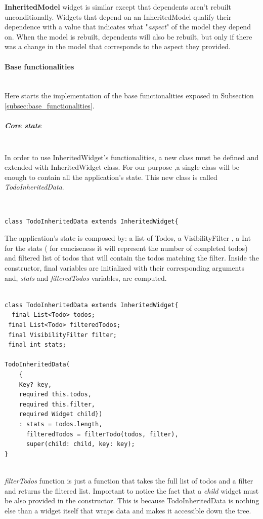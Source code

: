 \textbf{InheritedModel} widget is similar except that dependents aren't rebuilt unconditionally.
Widgets that depend on an InheritedModel qualify their dependence with a value that indicates what "\textit{aspect}" of the model they depend on. When the model is rebuilt, dependents will also be rebuilt, but only if there was a change in the model that corresponds to the aspect they provided.
\paragraph{Base functionalities} \mbox{} \\
\label{par:todo_app_inherited_widget_base_app}
Here starts the implementation of the base functionalities exposed in Subsection \ref{subsec:base_functionalities}.
\subparagraph{Core state}\mbox{}\\
\label{subpar:todo_app_inherited_widget_core_state}
In order to use InheritedWidget's functionalities, a new class must be defined and extended with InheritedWidget class. For our purpose ,a single class will be enough to contain all the application's state. This new class is called \textit{TodoInheritedData}.
\begin{code}
\mbox{}\\
 \mbox{}
		\label{code:2.14}
\begin{verbatim}
class TodoInheritedData extends InheritedWidget{
\end{verbatim}
\mbox{}
\end{code}
The application's state is composed by: a list of Todos, a VisibilityFilter , a Int for the stats ( for conciseness it will represent the number of completed todos) and filtered list of todos that will contain the todos matching the filter. Inside the constructor, final variables are initialized with their corresponding arguments and, \textit{stats} and \textit{filteredTodos} variables, are computed. 
\mbox{}\\
\begin{code}
\mbox{}
\label{code:2.15}
\begin{verbatim}

class TodoInheritedData extends InheritedWidget{
  final List<Todo> todos;
 final List<Todo> filteredTodos;
 final VisibilityFilter filter;
 final int stats;
 
TodoInheritedData(
    { 
    Key? key,
    required this.todos,
    required this.filter,
    required Widget child})
    : stats = todos.length,
      filteredTodos = filterTodo(todos, filter),
      super(child: child, key: key);
}
\end{verbatim}
\end{code}
\mbox{}\\
\textit{filterTodos} function is just a function that takes the full list of todos and a filter and returns the filtered list. Important to notice  the fact that a \textit{child} widget must be also provided in the constructor. This is because TodoInheritedData is nothing else than a widget itself that wraps data and makes it accessible down the tree.


